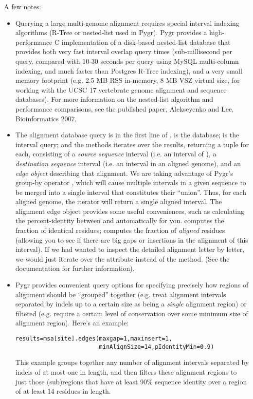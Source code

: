 \documentclass{howto}
\begin{document}
A few notes:

\begin{itemize}

\item
Querying a large multi-genome alignment requires special interval indexing
algorithms (R-Tree or nested-list used in Pygr).  Pygr provides a high-performance
C implementation of a disk-based nested-list database that provides both
very fast interval overlap query times (sub-millisecond per query, compared with
10-30 seconds per query using MySQL multi-column indexing, and much faster
than Postgres R-Tree indexing), and a very small memory footprint
(e.g. 2.5 MB RSS in-memory, 8 MB VSZ virtual size,
for working with the UCSC 17 vertebrate
genome alignment and sequence databases).  For more information on the
nested-list algorithm and performance comparisons, see the published paper,
Alekseyenko and Lee, Bioinformatics 2007.

\item
The alignment database query is in the first line of .
 is the database;  is the interval query; and the
 methods iterates over the results, returning a tuple for
each, consisting of a {\em source sequence} interval (i.e. an interval of
), a {\em destination sequence} interval (i.e. an interval in
an aligned genome), and an {\em edge object} describing that alignment.
We are taking advantage of Pygr's group-by operator ,
which will cause multiple intervals in a given sequence to be merged
into a single interval that constitutes their ``union''.  Thus,
for each aligned genome, the  iterator will return a single
aligned interval.  The alignment edge object provides some useful 
conveniences, such as calculating the percent-identity between 
and  automatically for you.   computes
the fraction of identical residues;  computes the 
fraction of {\em aligned} residues (allowing you to see if there are 
big gaps or insertions in the alignment of this interval).  If we 
had wanted to inspect the detailed alignment letter by letter, we
would just iterate over the  attribute instead of
the  method. (See the  documentation for 
further information).

\item
Pygr provides convenient query options for specifying precisely how regions
of alignment should be ``grouped'' together (e.g. treat alignment intervals
separated by indels up to a certain size as being a {\em single} alignment
region) or filtered (e.g. require a certain level of conservation over some
minimum size of alignment region).  Here's an example:
\begin{verbatim}
results=msa[site].edges(maxgap=1,maxinsert=1,
                        minAlignSize=14,pIdentityMin=0.9)
\end{verbatim}
This example groups together any number of alignment intervals separated by indels
of at most one in length, and then filters these alignment regions to
just those (sub)regions that have at least 90\% sequence identity over
a region of at least 14 residues in length.


\end{itemize}
\end{document}
